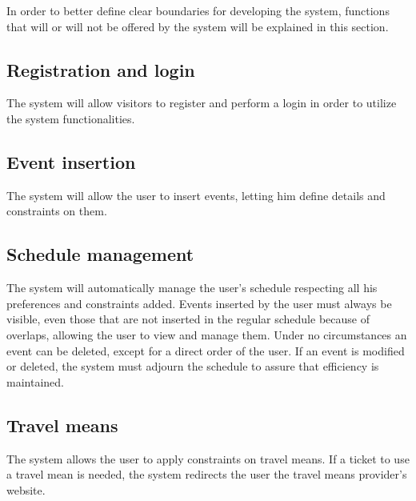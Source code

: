 In order to better define clear boundaries for developing the system, functions that  will or will not be offered by the system will be explained in this section.

\subsection{Registration and login}
The system will allow visitors to register and perform a login in order to utilize the system functionalities.

\subsection{Event insertion}
The system will allow the user to insert events, letting him define details and constraints on them.

\subsection{Schedule management}
The system will automatically manage the user's schedule respecting all his preferences and constraints added. 
\newline
Events inserted by the user must always be visible, even those that are not inserted in the regular schedule because of overlaps, allowing the user to view and manage them. Under no circumstances an event can be deleted, except for a direct order of the user.
\newline
If an event is modified or deleted, the system must adjourn the schedule to assure that efficiency is maintained.

\subsection{Travel means}
The system allows the user to apply constraints on travel means.
\newline
If a ticket to use a travel mean is needed, the system redirects the user the travel means provider's website.
